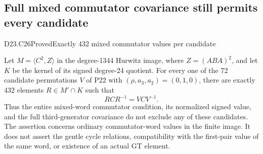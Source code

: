 \subsection{Full mixed commutator covariance still permits every candidate}

\begin{statement}{D23.C26}{Proved}{Exactly 432 mixed commutator values per candidate}
\end{statement}
Let $M=\langle C^2,Z\rangle$ in the degree-1344 Hurwitz image,
where $Z=(ABA)^2$, and let $K$ be the kernel of its signed
degree-24 quotient.  For every one of the 72 candidate
permutations $V$ of P22 with $(\rho,a_3,a_2)=(0,1,0)$,
there are exactly 432 elements $R\in M'\cap K$ such that
\[
                       RCR^{-1}=VCV^{-1}.                 \tag{D23.C26.1}
\]
Thus the entire mixed-word commutator condition, its normalized
signed value, and the full third-generator covariance do not
exclude any of these candidates.  The assertion concerns
ordinary commutator-word values in the finite image.  It does
not assert the gentle cycle relations, compatibility with the
first-pair value of the same word, or existence of an actual
GT element.

